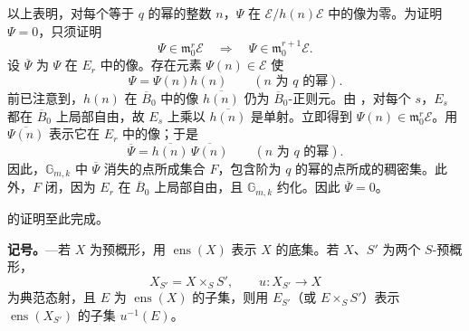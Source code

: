以上表明，对每个等于 \(q\) 的幂的整数 \(n\)，\(\Psi\) 在 \(\mathscr E/h(n)\mathscr E\) 中的像为零。为证明 \(\Psi=0\)，只须证明
\[
  \Psi\in\mathfrak m_0^r\mathscr E
  \quad\Longrightarrow\quad
  \Psi\in\mathfrak m_0^{r+1}\mathscr E.
\]
设 \(\overline\Psi\) 为 \(\Psi\) 在 \(E_r\) 中的像。存在元素 \(\Psi(n)\in\mathscr E\) 使
\[
  \Psi=\Psi(n)h(n)
  \qquad(n\text{ 为 }q\text{ 的幂}).
\]
前已注意到，\(h(n)\) 在 \(\overline B_0\) 中的像 \(\overline{h(n)}\) 仍为 \(\overline B_0\)-正则元。由 ，对每个 \(s\)，\(E_s\) 都在 \(\overline B_0\) 上局部自由，故 \(E_s\) 上乘以 \(\overline{h(n)}\) 是单射。立即得到 \(\Psi(n)\in\mathfrak m_0^r\mathscr E\)。用 \(\overline{\Psi(n)}\) 表示它在 \(E_r\) 中的像；于是
\[
  \overline\Psi=\overline{h(n)}\,\overline{\Psi(n)}
  \qquad(n\text{ 为 }q\text{ 的幂}).
\]
因此，\(\mathbb G_{m,k}\) 中 \(\overline\Psi\) 消失的点所成集合 \(F\)，包含阶为 \(q\) 的幂的点所成的稠密集。此外，\(F\) 闭，因为 \(E_r\) 在 \(\overline B_0\) 上局部自由，且 \(\mathbb G_{m,k}\) 约化。因此 \(\overline\Psi=0\)。

 的证明至此完成。



\noindent\textbf{记号。}---若 \(X\) 为预概形，用 \(\operatorname{ens}(X)\) 表示 \(X\) 的底集。若 \(X\)、\(S'\) 为两个 \(S\)-预概形，
\[
  X_{S'}=X\times_S S',
  \qquad u:X_{S'}\longrightarrow X
\]
为典范态射，且 \(E\) 为 \(\operatorname{ens}(X)\) 的子集，则用 \(E_{S'}\)（或 \(E\times_S S'\)）表示 \(\operatorname{ens}(X_{S'})\) 的子集 \(u^{-1}(E)\)。

